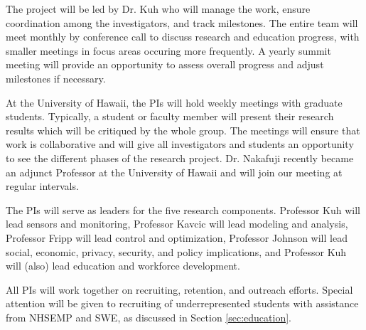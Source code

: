 The project will be led by Dr. Kuh who will manage the work, ensure
coordination among the investigators, and track milestones. The entire team
will meet monthly by conference call to discuss research and education
progress, with smaller meetings in focus areas occuring more frequently.  A
yearly summit meeting will provide an opportunity to assess overall
progress and adjust milestones if necessary.

At the University of Hawaii, the PIs will hold weekly meetings
with graduate students.  Typically, a student or faculty member will
present their research results which will be critiqued by the whole group.
The meetings will ensure that work is collaborative and will give all
investigators and students an opportunity to see the different phases of
the research project.  Dr. Nakafuji recently became an adjunct Professor at
the University of Hawaii and will join our meeting at regular intervals.

The PIs will serve as leaders for the five research components. Professor
Kuh will lead sensors and monitoring, Professor Kavcic will lead
modeling and analysis, Professor Fripp will lead control and optimization,
Professor Johnson will lead social, economic, privacy, security, and policy
implications, and Professor Kuh will (also) lead education and workforce
development. 

All PIs will work together on recruiting, retention, and outreach
efforts.  Special attention will be given to recruiting of underrepresented
students with assistance from NHSEMP and SWE, as discussed in Section \ref{sec:education}.
 

